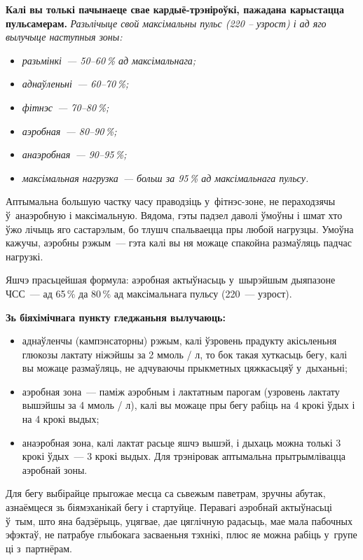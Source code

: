 \textbf{Калі вы толькі пачынаеце свае кардыё-трэніроўкі, пажадана карыстацца пульсамерам.} \emph{Разьлічыце свой максімальны пульс (220 -- узрост) і ад яго вылучыце наступныя зоны:}
\begin{itemize}
  \item \emph{разьмінкі~--- 50--60\,\% ад максімальнага;}
  \item \emph{аднаўленьні~--- 60--70\,\%;}
  \item \emph{фітнэс~--- 70--80\,\%;}
  \item \emph{аэробная~--- 80--90\,\%;}
  \item \emph{анаэробная~--- 90--95\,\%;}
  \item \emph{максімальная нагрузка~--- больш за 95\,\% ад максімальнага пульсу.}
\end{itemize}

Аптымальна большую частку часу праводзіць у~фітнэс-зоне, не пераходзячы ў~анаэробную і максімальную. Вядома, гэты падзел даволі ўмоўны і шмат хто ўжо лічыць яго састарэлым, бо тлушч спальваецца пры любой нагрузцы. Умоўна кажучы, аэробны рэжым~--- гэта калі вы ня можаце спакойна размаўляць падчас нагрузкі.

Яшчэ прасьцейшая формула: аэробная актыўнасьць у~шырэйшым дыяпазоне ЧСС~--- ад 65\,\% да 80\,\% ад максімальнага пульсу (220~--- узрост).

\textbf{Зь біяхімічнага пункту гледжаньня вылучаюць:}
\begin{itemize}
  \item аднаўленчы (кампэнсаторны) рэжым, калі ўзровень прадукту акісьленьня глюкозы лактату ніжэйшы за 2 ммоль / л, то бок такая хуткасьць бегу, калі вы можаце размаўляць, не адчуваючы прыкметных цяжкасьцяў у~дыханьні;
  \item аэробная зона~--- паміж аэробным і лактатным парогам (узровень лактату вышэйшы за 4 ммоль / л), калі вы можаце пры бегу рабіць на 4 крокі ўдых і на 4 крокі выдых;
  \item анаэробная зона, калі лактат расьце яшчэ вышэй, і дыхаць можна толькі 3 крокі ўдых~--- 3 крокі выдых. Для трэніровак аптымальна прытрымлівацца аэробнай зоны.
\end{itemize}


Для бегу выбірайце прыгожае месца са сьвежым паветрам, зручны абутак, азнаёмцеся зь біямэханікай бегу і стартуйце. Перавагі аэробнай актыўнасьці ў~тым, што яна бадзёрыць, уцягвае, дае цяглічную радасьць, мае мала пабочных эфэктаў, не патрабуе глыбокага засваеньня тэхнікі, плюс яе можна рабіць у~групе ці з~партнёрам.

